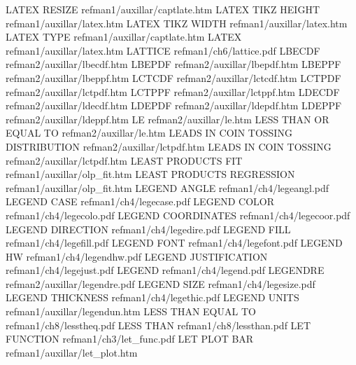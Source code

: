 LATEX RESIZE                            refman1/auxillar/captlate.htm
LATEX TIKZ HEIGHT                       refman1/auxillar/latex.htm
LATEX TIKZ WIDTH                        refman1/auxillar/latex.htm
LATEX TYPE                              refman1/auxillar/captlate.htm
LATEX                                   refman1/auxillar/latex.htm
LATTICE                                 refman1/ch6/lattice.pdf
LBECDF                                  refman2/auxillar/lbecdf.htm
LBEPDF                                  refman2/auxillar/lbepdf.htm
LBEPPF                                  refman2/auxillar/lbeppf.htm
LCTCDF                                  refman2/auxillar/lctcdf.htm
LCTPDF                                  refman2/auxillar/lctpdf.htm
LCTPPF                                  refman2/auxillar/lctppf.htm
LDECDF                                  refman2/auxillar/ldecdf.htm
LDEPDF                                  refman2/auxillar/ldepdf.htm
LDEPPF                                  refman2/auxillar/ldeppf.htm
LE                                      refman2/auxillar/le.htm
LESS THAN OR EQUAL TO                   refman2/auxillar/le.htm
LEADS IN COIN TOSSING DISTRIBUTION      refman2/auxillar/lctpdf.htm
LEADS IN COIN TOSSING                   refman2/auxillar/lctpdf.htm
LEAST PRODUCTS FIT                      refman1/auxillar/olp_fit.htm
LEAST PRODUCTS REGRESSION               refman1/auxillar/olp_fit.htm
LEGEND ANGLE                            refman1/ch4/legeangl.pdf
LEGEND CASE                             refman1/ch4/legecase.pdf
LEGEND COLOR                            refman1/ch4/legecolo.pdf
LEGEND COORDINATES                      refman1/ch4/legecoor.pdf
LEGEND DIRECTION                        refman1/ch4/legedire.pdf
LEGEND FILL                             refman1/ch4/legefill.pdf
LEGEND FONT                             refman1/ch4/legefont.pdf
LEGEND HW                               refman1/ch4/legendhw.pdf
LEGEND JUSTIFICATION                    refman1/ch4/legejust.pdf
LEGEND                                  refman1/ch4/legend.pdf
LEGENDRE                                refman2/auxillar/legendre.pdf
LEGEND SIZE                             refman1/ch4/legesize.pdf
LEGEND THICKNESS                        refman1/ch4/legethic.pdf
LEGEND UNITS                            refman1/auxillar/legendun.htm
LESS THAN EQUAL TO                      refman1/ch8/lesstheq.pdf
LESS THAN                               refman1/ch8/lessthan.pdf
LET FUNCTION                            refman1/ch3/let_func.pdf
LET PLOT BAR                            refman1/auxillar/let_plot.htm
